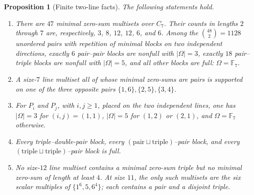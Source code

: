 \documentclass[10pt,a4paper]{amsart}
\newtheorem{proposition}{Proposition}
\newcommand{\F}{\mathbb F}
\newcommand{\Om}{\Omega}
\begin{document}
\begin{proposition}[Finite two-line facts]\label{prop:Ffacts}
The following statements hold.
\begin{enumerate}[label=(F\arabic*)]
\item There are $47$ minimal zero-sum multisets over $C_7$. Their counts in lengths $2$ through $7$ are, respectively, $3$, $8$, $12$, $12$, $6$, and $6$. Among the $\binom{48}{2}=1128$ unordered pairs with repetition of minimal blocks on two independent directions, exactly $6$ pair--pair blocks are nonfull with $|\Om|=3$, exactly $18$ pair--triple blocks are nonfull with $|\Om|=5$, and all other blocks are full: $\Om=\F_7$.
\item A size-$7$ line multiset all of whose minimal zero-sums are pairs is supported on one of the three opposite pairs $\{1,6\},\{2,5\},\{3,4\}$.
\item For $P_i$ and $P_j$, with $i,j\geq1$, placed on the two independent lines, one has $|\Om|=3$ for $(i,j)=(1,1)$, $|\Om|=5$ for $(1,2)$ or $(2,1)$, and $\Om=\F_7$ otherwise.
\item Every triple--double-pair block, every $(\text{pair}\sqcup\text{triple})$--pair block, and every $(\text{triple}\sqcup\text{triple})$--pair block is full.
\item No size-$12$ line multiset contains a minimal zero-sum triple but no minimal zero-sum of length at least $4$. At size $11$, the only such multisets are the six scalar multiples of $\{1^6,5,6^4\}$; each contains a pair and a disjoint triple.
\end{enumerate}
\end{proposition}
\end{document}
